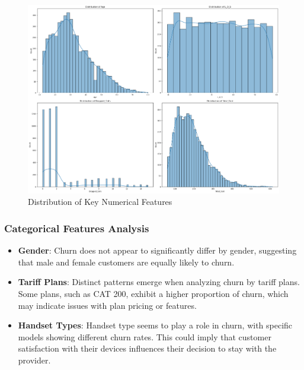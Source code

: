 \documentclass{article}
\begin{document}
\begin{figure}[h]
\centering
\includegraphics[width=0.8\linewidth]{Distribution of Key Numerical Features.png}
\caption{Distribution of Key Numerical Features}
\label{fig:distribution}
\end{figure}


\subsubsection{Categorical Features Analysis}

\begin{itemize}
    \item \textbf{Gender}: Churn does not appear to significantly differ by gender, suggesting that male and female customers are equally likely to churn.

    \item \textbf{Tariff Plans}: Distinct patterns emerge when analyzing churn by tariff plans. Some plans, such as CAT 200, exhibit a higher proportion of churn, which may indicate issues with plan pricing or features.

    \item \textbf{Handset Types}: Handset type seems to play a role in churn, with specific models showing different churn rates. This could imply that customer satisfaction with their devices influences their decision to stay with the provider.
\end{itemize}
\end{document}
